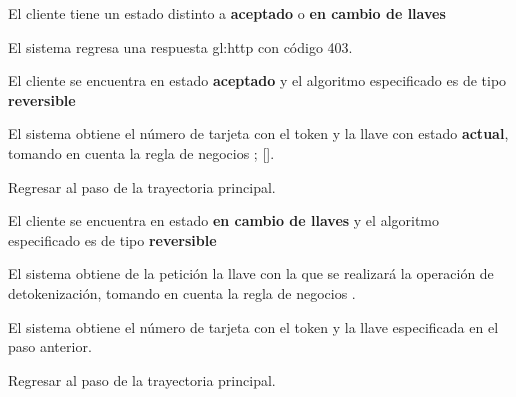 {  \begin{trayectoriaAlternativa}
    {El cliente tiene un estado distinto a \textbf{aceptado} o
      \textbf{en cambio de llaves}}

    \item El sistema regresa una respuesta \gls{gl:http} con código 403.

  \end{trayectoriaAlternativa}


  \begin{trayectoriaAlternativa}
    {El cliente se encuentra en estado \textbf{aceptado} y el algoritmo
    especificado es de tipo \textbf{reversible}}

    \item El sistema obtiene el número de tarjeta con el token y la llave
      con estado \textbf{actual}, tomando en cuenta la regla de negocios
      ;
      [].

    \item Regresar al paso  de la trayectoria
      principal.

  \end{trayectoriaAlternativa}


  \begin{trayectoriaAlternativa}
    {El cliente se encuentra en estado \textbf{en cambio de llaves} y el
    algoritmo especificado es de tipo \textbf{reversible}}

    \item El sistema obtiene de la petición la llave con la que se realizará
      la operación de detokenización, tomando en cuenta la regla de negocios
      .

    \item El sistema obtiene el número de tarjeta con el token y la llave
      especificada en el paso anterior.

    \item Regresar al paso  de la trayectoria
      principal.

  \end{trayectoriaAlternativa}

}
